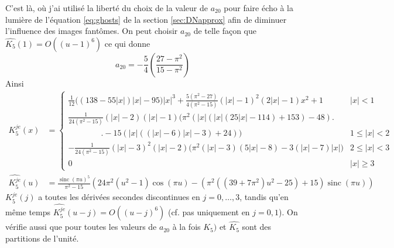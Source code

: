 \documentclass[11pt,twoside]{article}
\DeclareMathOperator{\sinc}{sinc}
\newcommand{\nn}{\nonumber}
\begin{document}
C'est là, où j'ai utilisé la liberté du choix de la valeur de $a_{20}$ pour faire écho à la lumière de l'équation \ref{eq:ghosts} de la section \ref{sec:DNapprox} afin de diminuer l'influence des images fantômes. On peut choisir $a_{20}$ de telle façon que $\widehat{K_5}(1)=O((u-1)^6)$ ce qui donne
\begin{equation}
a_{20} = -\frac{5}{4}\left(\frac{27-\pi^2}{15-\pi^2}\right)
\end{equation}
Ainsi
\begin{align}
K^{je}_5(x) &= \begin{cases}
\frac{1}{12} \Big((138-55 |x|) |x|-95\Big) |x|^3+\frac{5 \left(\pi ^2-27\right)}{4 \left(\pi^2-15\right)} (|x|-1)^2 (2 |x|-1) x^2 +1& |x|< 1 \\
\frac{1}{24 \left(\pi^2-15\right)}(|x|-2) (|x|-1) \Big(\pi ^2 (|x| (|x| (25 |x|-114)+153)-48)\Big.& \nn\\
\qquad\qquad \Big.-15 (|x| ((|x|-6) |x|-3)+24)\Big)& 1\leq |x|<2 \nn\\
-\frac{1}{24 \left(\pi ^2-15\right)}(|x|-3)^2 (|x|-2) \Big(\pi^2 (|x|-3) (5 |x|-8)-3 (|x|-7) |x|\Big) & 2\leq |x|<3 \nn \\
0 & |x| \geq 3
\end{cases}\\
\widehat{K^{je}_5}(u)&= \frac{\sinc(\pi u)^5}{\pi^2-15} \left(24 \pi^2 (u^2-1) \cos (\pi u)-(\pi^2 ((39+7 \pi^2) u^2-25)+15) \sinc(\pi  u)\right)
\label{eq:quinticJE-kernel}
\end{align}
$K^{je}_5(j)$ a toutes les dérivées secondes discontinues en $j=0,\dots,3$, tandis qu'en même temps  $\widehat{K^{je}_5}(u-j)=O((u-j)^6)$ (cf. pas uniquement en $j=0,1$). On vérifie aussi que pour toutes les valeurs de $a_{20}$ à la fois $K_5)$ et $\widehat{K_5}$ sont des partitions de l'unité.
\end{document}
